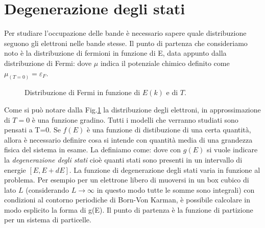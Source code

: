 \documentclass[a4paper,12pt]{article}
\begin{document}
\section{Degenerazione degli stati}
Per studiare l'occupazione delle bande è necessario sapere quale distribuzione seguono gli elettroni nelle bande stesse. Il punto di partenza che consideriamo noto è la distribuzione di fermioni in funzione di E, data appunto dalla distribuzione di Fermi:
dove $\mu$ indica il potenziale chimico definito come $\mu_{(T=0)}=\varepsilon_F$.
\begin{figure}
	\centering
	\caption{Distribuzione di Fermi in funzione di $E(k)$ e di $T$.}
	\label{Fermi}
\end{figure}
Come si può notare dalla Fig.\ref{Fermi} la distribuzione degli elettroni, in approssimazione di $T=0$ è una funzione gradino. Tutti i modelli che verranno studiati sono pensati a T=0. Se $f(E)$ è una funzione di distibuzione di una certa quantità, allora è necessario definire cosa si intende con quantità media di una grandezza fisica del sistema in esame. La definiamo come:
dove con $g(E)$ si vuole indicare la \textit{degenerazione degli stati} cioè quanti stati sono presenti in un intervallo di energie $[E,E+dE]$. La funzione di degenerazione degli stati varia in funzione al problema. Per esempio per un elettrone libero di muoversi in un box cubico di lato $L$ (considerando $L\to\infty$ in questo modo tutte le somme sono integrali) con condizioni al contorno periodiche di Born-Von Karman, è possibile calcolare in modo esplicito la forma di g(E). Il punto di partenza è la funzione di partizione per un sistema di particelle. 
\end{document}
